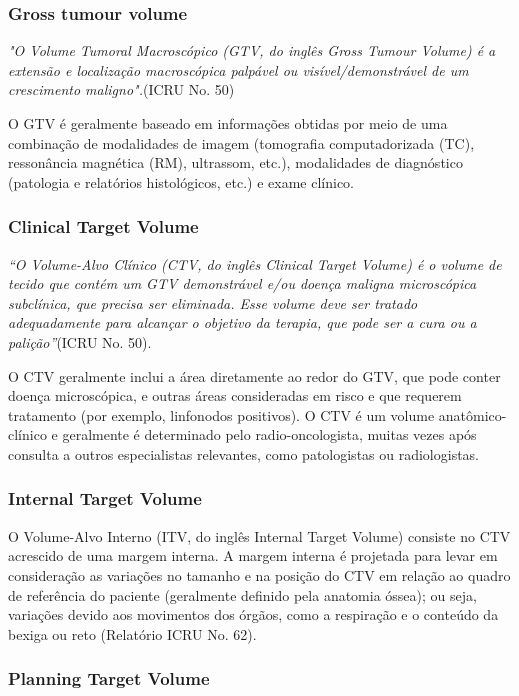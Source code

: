 \documentclass[11pt,a4paper]{article}
\newcounter{exemplo}
\begin{document}
\subsubsection*{Gross tumour volume}

	\textit{"O Volume Tumoral Macroscópico (GTV, do inglês Gross Tumour Volume) é a extensão e localização macroscópica palpável ou visível/demonstrável de um crescimento maligno".}(ICRU No. 50)

	O GTV é geralmente baseado em informações obtidas por meio de uma combinação de modalidades de imagem (tomografia computadorizada (TC), ressonância magnética (RM), ultrassom, etc.), modalidades de diagnóstico (patologia e relatórios histológicos, etc.) e exame clínico.

\subsubsection*{Clinical Target Volume}

	\textit{``O Volume-Alvo Clínico (CTV, do inglês Clinical Target Volume) é o volume de tecido que contém um GTV demonstrável e/ou doença maligna microscópica subclínica, que precisa ser eliminada. Esse volume deve ser tratado adequadamente para alcançar o objetivo da terapia, que pode ser a cura ou a palição''}(ICRU No. 50).

	O CTV geralmente inclui a área diretamente ao redor do GTV, que pode conter doença microscópica, e outras áreas consideradas em risco e que requerem tratamento (por exemplo, linfonodos positivos). O CTV é um volume anatômico-clínico e geralmente é determinado pelo radio-oncologista, muitas vezes após consulta a outros especialistas relevantes, como patologistas ou radiologistas.

\subsubsection*{Internal Target Volume}

	O Volume-Alvo Interno (ITV, do inglês Internal Target Volume) consiste no CTV acrescido de uma margem interna. A margem interna é projetada para levar em consideração as variações no tamanho e na posição do CTV em relação ao quadro de referência do paciente (geralmente definido pela anatomia óssea); ou seja, variações devido aos movimentos dos órgãos, como a respiração e o conteúdo da bexiga ou reto (Relatório ICRU No. 62).

\subsubsection*{Planning Target Volume}
\end{document}
